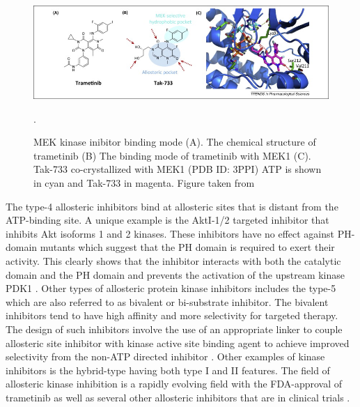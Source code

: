 \documentclass[a4paper, 11pt]{article}
\begin{document}
\begin{figure}[H]
	\includegraphics[width=\linewidth]{figures/trametinib.jpg}
	\centering
	\caption{MEK kinase inibitor binding mode (A). The chemical structure of trametinib (B) The binding mode of trametinib with MEK1 (C). Tak-733 co-crystallized with MEK1 (PDB ID: 3PPI) ATP is shown in cyan and Tak-733 in magenta. Figure taken from \cite{wu2015fda}}.
	\label{trametinib}
\end{figure}
The type-4 allosteric inhibitors bind at allosteric sites that is distant from the ATP-binding site. A unique example is the AktI-1/2 targeted inhibitor that inhibits Akt isoforms 1 and 2 kinases. These inhibitors have no effect against PH-domain mutants which suggest that the PH domain is required to exert their activity. This clearly shows that the inhibitor interacts with both the catalytic domain and the PH domain and prevents the activation of the upstream kinase PDK1 \cite{barnett2005identification}. Other types of allosteric protein kinase inhibitors includes the type-5 which are also referred to as bivalent or bi-substrate inhibitor. The bivalent inhibitors tend to have high affinity and more selectivity for targeted therapy. The design of such inhibitors involve the use of an appropriate linker to couple allosteric site inhibitor with kinase active site binding agent to achieve improved selectivity from the non-ATP directed inhibitor \cite {lamba2012new}. Other examples of kinase inhibitors is the hybrid-type having both type I and II features. The field of allosteric kinase inhibition is a rapidly evolving field with the FDA-approval of trametinib as well as several other allosteric inhibitors that are in clinical trials \cite{wu2015allosteric}.
\end{document}
